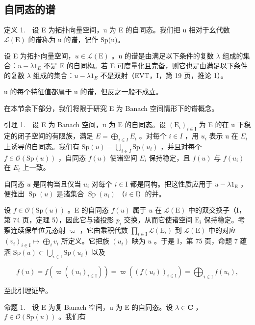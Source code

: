 \subsection{自同态的谱}

定义 1.　设 E 为拓扑向量空间，u 为 E 的自同态。我们把 u 相对于幺代数 \(\mathcal{L}(\mathrm{E})\) 的谱称为 u 的谱，记作 Sp(u)。

设 E 为拓扑向量空间，\(u \in \mathcal{L}(\mathrm{E})\) 。u 的谱是由满足以下条件的复数 \(\lambda\) 组成的集合：\(u - \lambda1_{E}\) 不是 E 的自同构。若 E 可度量化且完备，则它也是由满足以下条件的复数 \(\lambda\) 组成的集合：\(u - \lambda1_{E}\) 不是双射（EVT，I，第 19 页，推论 1）。

u 的每个特征值都属于 u 的谱，但反之一般不成立。

在本节余下部分，我们将限于研究 E 为 Banach 空间情形下的谱概念。

引理 1.　设 E 为 Banach 空间，u 为 E 的自同态。设 \((\mathrm{E}_{i})_{i\in\mathrm{I}}\) 为 E 的在 u 下稳定的闭子空间的有限族，满足 \(E = \bigoplus_{i\in I} E_{i}\) 。对每个 \(i \in I\) ，用 \(u_{i}\) 表示 u 在 \(E_{i}\) 上诱导的自同态。我们有 \(\mathrm{Sp}(u) = \bigcup_{i\in I} \mathrm{Sp}(u_{i})\) ，并且对每个 \(f \in \mathcal{O}(\mathrm{Sp}(u))\) ，自同态 \(f(u)\) 使诸空间 \(E_{i}\) 保持稳定，且 \(f(u)\) 与 \(f(u_{i})\) 在 \(E_{i}\) 上一致。

自同态 \(u\) 是同构当且仅当 \(u_i\) 对每个 \(i \in \mathrm{I}\) 都是同构。把这性质应用于 \(u - \lambda 1_{\mathrm{E}}\) ，便推出 \(\operatorname{Sp}(u)\) 是诸集合 \(\operatorname{Sp}(u_i)\) （\(i \in \mathrm{I}\)）的并。

设 \(f \in \mathcal{O}(\mathrm{Sp}(u))\) 。E 的自同态 \(f(u)\) 属于 \(u\) 在 \(\mathcal{L}(\mathrm{E})\) 中的双交换子（I，第 74 页，定理 5），因此它与诸投影 \(p_i\) 交换，从而它使诸空间 \(\mathrm{E}_i\) 保持稳定。考察连续保单位元态射 \(\varpi\) ，它由乘积代数 \(\prod_{i \in \mathrm{I}} \mathcal{L}(\mathrm{E}_i)\) 到 \(\mathcal{L}(\mathrm{E})\) 中的对应 \((v_i)_{i \in \mathrm{I}} \mapsto \bigoplus_i v_i\) 所定义。它把族 \((u_i)\) 映为 \(u\) 。于是 I，第 75 页，命题 7 蕴涵 \(\mathrm{Sp}(u) \subset \bigcup_{i \in \mathrm{I}} \mathrm{Sp}(u_i)\) 以及

\[
f (u) = f (\varpi ((u _ {i}) _ {i \in \mathrm{I}})) = \varpi ((f (u _ {i})) _ {i \in \mathrm{I}}) = \bigoplus_ {i \in \mathrm{I}} f (u _ {i}),
\]

至此引理证毕。

命题 1.　设 E 为复 Banach 空间，u 为 E 的自同态。设 \(\lambda \in \mathbf{C}\) ，\(f \in \mathcal{O}(\mathrm{Sp}(u))\) 。我们有

